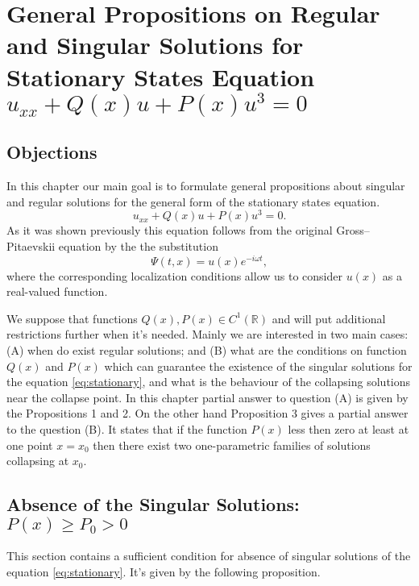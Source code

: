\chapter{General Propositions on Regular and Singular Solutions for Stationary States Equation $u_{xx} + Q(x) u + P(x) u^3 = 0$}

\section{Objections}

In this chapter our main goal is to formulate general propositions about singular and regular solutions for the general form of the stationary states equation.
\begin{equation}
	u_{xx} + Q(x) u + P(x) u^3 = 0.
	\label{eq:stationary}
\end{equation}
As it was shown previously this equation follows from the original Gross--Pitaevskii equation by the the substitution
\begin{equation}
	\Psi(t, x) = u(x) e^{-i \omega t},
\end{equation}
where the corresponding localization conditions allow us to consider $u(x)$ as a real-valued function.

We suppose that functions $Q(x), P(x) \in C^1(\mathbb{R})$ and will put additional restrictions further when it's needed.
Mainly we are interested in two main cases: (A) when do exist regular solutions; and (B) what are the conditions on function $Q(x)$ and $P(x)$ which can guarantee the existence of the singular solutions for the equation \eqref{eq:stationary}, and what is the behaviour of the collapsing solutions near the collapse point.
In this chapter partial answer to question (A) is given by the Propositions 1 and 2.
On the other hand Proposition 3 gives a partial answer to the question (B).
It states that if the function $P(x)$ less then zero at least at one point $x = x_0$ then there exist two one-parametric families of solutions collapsing at $x_0$.

\section{Absence of the Singular Solutions: $P(x) \ge P_0 > 0$}

This section contains a sufficient condition for absence of singular solutions of the equation \eqref{eq:stationary}.
It's given by the following proposition.

